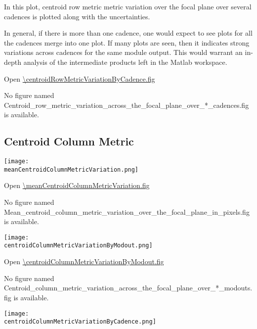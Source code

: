 In this plot, centroid row metric metric variation over the focal
plane over several cadences is plotted along with the uncertainties.

In general, if there is more than one cadence, one would expect to see
plots for all the cadences merge into one plot. If many plots are
seen, then it indicates strong variations across cadences for the same
module output. This would warrant an in-depth analysis of the
intermediate products left in the Matlab workspace.

Open \url{\centroidRowMetricVariationByCadence.fig}

\else
No figure named
Centroid\_row\_metric\_variation\_across\_the\_focal\_plane\_over\_*\_cadences.fig is
available.
\fi
\clearpage

\subsection{Centroid Column Metric}

\ifdefined \meanCentroidColumnMetricVariation

\begin{center}
  \texttt{[image: \\meanCentroidColumnMetricVariation.png]}
\end{center}

\meanCentroidColumnMetricVariationCaption

Open \url{\meanCentroidColumnMetricVariation.fig}

\else
No figure named
Mean\_centroid\_column\_metric\_variation\_over\_the\_focal\_plane\_in\_pixels.fig is
available.
\fi
\clearpage

\ifdefined \centroidColumnMetricVariationByModout

\begin{center}
  \texttt{[image: \\centroidColumnMetricVariationByModout.png]}
\end{center}

\centroidColumnMetricVariationByModoutCaption

Open \url{\centroidColumnMetricVariationByModout.fig}

\else
No figure named
Centroid\_column\_metric\_variation\_across\_the\_focal\_plane\_over\_*\_modouts.fig is
available.
\fi
\clearpage

\ifdefined \centroidColumnMetricVariationByCadence

\begin{center}
  \texttt{[image: \\centroidColumnMetricVariationByCadence.png]}
\end{center}

